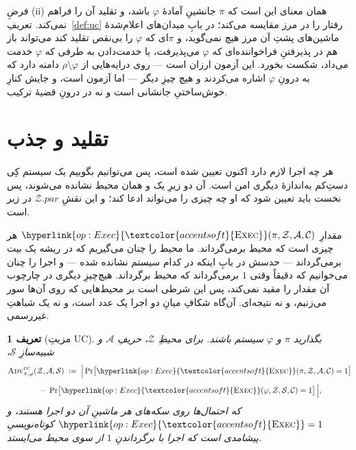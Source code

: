 \documentclass[10pt,oneside,openany]{book}
\newcommand{\pars}{\mathit{par}}
\newcommand{\Corr}{\mathcal{C}}
\newcommand{\Zenv}{\mathcal{Z}}
\newcommand{\Adv}{\mathcal{A}}
\newcommand{\Sim}{\mathcal{S}}
\newcommand{\advtg}{\op{Adv}}
\newcommand{\op}[1]{\textnormal{\textsc{#1}}}
\newcommand{\opl}[1]{\hyperlink{op:#1}{\textcolor{accentsoft}{\op{#1}}}}
\theoremstyle{accentdef}
\newtheorem{definition}{تعریف}[chapter]
\theoremstyle{accentplain}
\begin{document}
فرضِ (ii) همان معنای این است که $\pi$ جانشینِ آمادهٔ $\varphi$ باشد، و
تقلید آن را فراهم نمی‌کند. تعریفِ~\ref{def:uc} رفتار را در مرز مقایسه
می‌کند؛ در بابِ میدان‌های اعلام‌شدهٔ ماشین‌های پشتِ آن مرز هیچ نمی‌گوید، و
$\pi$ای که $\varphi$ را بی‌نقص تقلید کند می‌تواند باز هم در پذیرفتنِ
فراخواننده‌ای که $\varphi$ می‌پذیرفت، یا خدمت‌دادن به طرفی که $\varphi$
خدمت می‌داد، شکست بخورد. این آزمون ارزان است --- روی درایه‌هایی از $\rho
\setminus \varphi$ دامنه دارد که به درونِ $\varphi$ اشاره می‌کردند و هیچ
چیزِ دیگر --- اما آزمون است، و جایش کنارِ خوش‌ساختیِ جانشانی است و نه در
درونِ قضیهٔ ترکیب.

\section{تقلید و جذب}\label{sec:emabs}


هر چه اجرا لازم دارد اکنون تعیین شده است، پس می‌توانیم بگوییم یک سیستم کِی
دستِ‌کم به‌اندازهٔ دیگری امن است. آن دو زیرِ یک و همان محیط نشانده می‌شوند،
پس نخست باید تعیین شود که او چه چیزی را می‌تواند ادعا کند؛ و این نقشِ
$\Zenv.\pars$ در زیر است.

مقدارِ $\opl{Exec}(\pi,\Zenv,\Adv,\Corr)$ هر چیزی است که محیط برمی‌گرداند.
ما محیط را چنان می‌گیریم که در ریشه یک بیت برمی‌گرداند --- حدسش در بابِ
اینکه در کدام سیستم نشانده شده --- و اجرا را چنان می‌خوانیم که دقیقاً
وقتی $1$ برمی‌گرداند که محیط برگرداند. هیچ‌چیزِ دیگری در چارچوب آن مقدار
را مقید نمی‌کند، پس این شرطی است بر محیط‌هایی که روی آن‌ها سور می‌زنیم، و
نه نتیجه‌ای. آن‌گاه شکافِ میانِ دو اجرا یک عدد است، و نه یک شباهتِ
غیررسمی.

\begin{definition}[مزیتِ UC]\label{def:adv}
بگذارید $\pi$ و $\varphi$ سیستم باشند. برای محیطِ $\Zenv$، حریفِ $\Adv$ و
شبیه‌سازِ $\Sim$،
\[
  \begin{gathered}
  \advtg^{\op{uc}}_{\pi,\varphi}(\Zenv,\Adv,\Sim)
  \;:=\;
  \Bigl|\, \Pr\bigl[\opl{Exec}(\pi,\Zenv,\Adv,\Corr) = 1\bigr] \\[3pt]
  \;-\; \Pr\bigl[\opl{Exec}(\varphi,\Zenv,\Sim,\Corr) = 1\bigr] \,\Bigr| ,
  \end{gathered}
\]
که احتمال‌ها روی سکه‌های هر ماشینِ آن دو اجرا هستند، و $\opl{Exec} = 1$
کوتاه‌نویسیِ پیشامدی است که اجرا با برگرداندنِ $1$ از سوی محیط می‌ایستد.
\end{definition}
\end{document}
